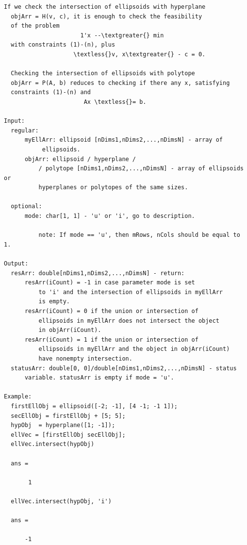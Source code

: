 \documentclass[letterpaper,10pt,english]{sphinxmanual}
\begin{document}
\begin{Verbatim}[commandchars=\\\{\}]
  If we check the intersection of ellipsoids with hyperplane
  objArr = H(v, c), it is enough to check the feasibility
  of the problem
                      1'x --\textgreater{} min
  with constraints (1)-(n), plus
                    \textless{}v, x\textgreater{} - c = 0.

  Checking the intersection of ellipsoids with polytope
  objArr = P(A, b) reduces to checking if there any x, satisfying
  constraints (1)-(n) and
                       Ax \textless{}= b.

Input:
  regular:
      myEllArr: ellipsoid [nDims1,nDims2,...,nDimsN] - array of
           ellipsoids.
      objArr: ellipsoid / hyperplane /
          / polytope [nDims1,nDims2,...,nDimsN] - array of ellipsoids or
          hyperplanes or polytopes of the same sizes.

  optional:
      mode: char[1, 1] - 'u' or 'i', go to description.

          note: If mode == 'u', then mRows, nCols should be equal to 1.

Output:
  resArr: double[nDims1,nDims2,...,nDimsN] - return:
      resArr(iCount) = -1 in case parameter mode is set
          to 'i' and the intersection of ellipsoids in myEllArr
          is empty.
      resArr(iCount) = 0 if the union or intersection of
          ellipsoids in myEllArr does not intersect the object
          in objArr(iCount).
      resArr(iCount) = 1 if the union or intersection of
          ellipsoids in myEllArr and the object in objArr(iCount)
          have nonempty intersection.
  statusArr: double[0, 0]/double[nDims1,nDims2,...,nDimsN] - status
      variable. statusArr is empty if mode = 'u'.

Example:
  firstEllObj = ellipsoid([-2; -1], [4 -1; -1 1]);
  secEllObj = firstEllObj + [5; 5];
  hypObj  = hyperplane([1; -1]);
  ellVec = [firstEllObj secEllObj];
  ellVec.intersect(hypObj)

  ans =

       1

  ellVec.intersect(hypObj, 'i')

  ans =

      -1
\end{Verbatim}
\end{document}
